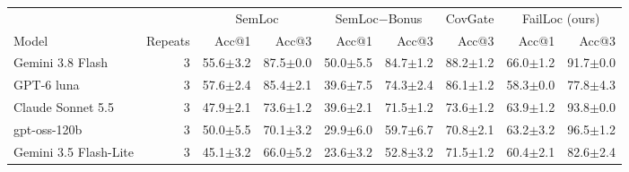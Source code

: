 \begin{tabular}{lrrrrrrrr}
\toprule
 & & \multicolumn{2}{c}{SemLoc} & \multicolumn{2}{c}{SemLoc−Bonus} & CovGate & \multicolumn{2}{c}{FailLoc (ours)} \\
\cmidrule(lr){3-4}\cmidrule(lr){5-6}\cmidrule(lr){7-7}\cmidrule(lr){8-9}
Model & Repeats & Acc@1 & Acc@3 & Acc@1 & Acc@3 & Acc@3 & Acc@1 & Acc@3 \\
\midrule
Gemini 3.8 Flash & 3 & 55.6{\scriptsize$\pm$3.2} & 87.5{\scriptsize$\pm$0.0} & 50.0{\scriptsize$\pm$5.5} & 84.7{\scriptsize$\pm$1.2} & 88.2{\scriptsize$\pm$1.2} & 66.0{\scriptsize$\pm$1.2} & 91.7{\scriptsize$\pm$0.0} \\
GPT-6 luna & 3 & 57.6{\scriptsize$\pm$2.4} & 85.4{\scriptsize$\pm$2.1} & 39.6{\scriptsize$\pm$7.5} & 74.3{\scriptsize$\pm$2.4} & 86.1{\scriptsize$\pm$1.2} & 58.3{\scriptsize$\pm$0.0} & 77.8{\scriptsize$\pm$4.3} \\
Claude Sonnet 5.5 & 3 & 47.9{\scriptsize$\pm$2.1} & 73.6{\scriptsize$\pm$1.2} & 39.6{\scriptsize$\pm$2.1} & 71.5{\scriptsize$\pm$1.2} & 73.6{\scriptsize$\pm$1.2} & 63.9{\scriptsize$\pm$1.2} & 93.8{\scriptsize$\pm$0.0} \\
gpt-oss-120b & 3 & 50.0{\scriptsize$\pm$5.5} & 70.1{\scriptsize$\pm$3.2} & 29.9{\scriptsize$\pm$6.0} & 59.7{\scriptsize$\pm$6.7} & 70.8{\scriptsize$\pm$2.1} & 63.2{\scriptsize$\pm$3.2} & 96.5{\scriptsize$\pm$1.2} \\
Gemini 3.5 Flash-Lite & 3 & 45.1{\scriptsize$\pm$3.2} & 66.0{\scriptsize$\pm$5.2} & 23.6{\scriptsize$\pm$3.2} & 52.8{\scriptsize$\pm$3.2} & 71.5{\scriptsize$\pm$1.2} & 60.4{\scriptsize$\pm$2.1} & 82.6{\scriptsize$\pm$2.4} \\
\bottomrule
\end{tabular}
